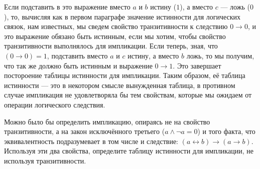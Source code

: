 Если подставить в это выражение вместо $a$ и $b$ истину ($1$), а вместо $c$ --- ложь ($0$), то, вычисляя как в первом параграфе значение истинности для логических связок, нам известных, мы сведем свойство транзитивности к следствию $0 \to 0$, и это выражение обязано быть истинным, если мы хотим, чтобы свойство транзитивности выполнялось для импликации. Если теперь, зная, что $(0 \to 0) = 1$, подставить вместо $a$ и $c$ истину, а вместо $b$ ложь, то мы получим, что так же должно быть истинным и выражение $0 \to 1$. Это завершает постороение таблицы истинности для импликации. Таким образом, её таблица истинности --- это в некотором смысле вынужденная таблица, в противном случае импликация не удовлетворяла бы тем свойствам, которые мы ожидаем от операции логического следствия.

\begin{exercise}Можно было бы определить импликацию, опираясь не на свойство транзитивности, а на закон исключённого третьего ($a \land \neg a = 0$) и того факта, что эквивалентность подразумевает в том числе и следствие: $(a \leftrightarrow b) \to (a \to b)$. Используя эти два свойства, определите таблицу истинности для импликации, не используя транзитивности.\end{exercise}
